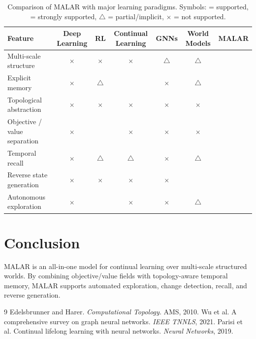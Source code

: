 \documentclass[11pt,english]{article}
\theoremstyle{remark}
\begin{document}
\begin{table}[t]
	\centering
	\caption{Comparison of MALAR with major learning paradigms. 
		Symbols: \checkmark = supported, \checkmark\checkmark = strongly supported, 
		$\triangle$ = partial/implicit, $\times$ = not supported.}
	\label{tab:comparison}
	\begin{tabular}{lcccccc}
		\toprule
		\textbf{Feature} 
		& \textbf{Deep Learning} 
		& \textbf{RL} 
		& \textbf{Continual Learning} 
		& \textbf{GNNs} 
		& \textbf{World Models} 
		& \textbf{MALAR} \\
		\midrule
		Multi-scale structure            & $\times$ & $\times$ & $\times$ & $\triangle$ & $\triangle$ & \textbf{\checkmark} \\
		Explicit memory                  & $\times$ & $\triangle$ & \checkmark & $\times$ & $\triangle$ & \textbf{\checkmark\checkmark} \\
		Topological abstraction          & $\times$ & $\times$ & $\times$ & $\times$ & $\times$ & \textbf{\checkmark} \\
		Objective / value separation     & $\times$ & \checkmark & $\times$ & $\times$ & $\times$ & \textbf{\checkmark} \\
		Temporal recall                  & $\times$ & $\triangle$ & $\triangle$ & $\times$ & $\triangle$ & \textbf{\checkmark\checkmark} \\
		Reverse state generation         & $\times$ & $\times$ & $\times$ & $\times$ & \checkmark & \textbf{\checkmark\checkmark} \\
		Autonomous exploration           & $\times$ & \checkmark & $\times$ & $\times$ & $\triangle$ & \textbf{\checkmark} \\
		\bottomrule
	\end{tabular}
\end{table}

\section{Conclusion}
MALAR is an all-in-one model for continual learning over multi-scale structured worlds. By combining objective/value fields
with topology-aware temporal memory, MALAR supports automated exploration, change detection, recall, and reverse generation.


\begin{thebibliography}{9}
	 Edelsbrunner and Harer. \emph{Computational Topology}. AMS, 2010.
	 Wu et al. A comprehensive survey on graph neural networks. \emph{IEEE TNNLS}, 2021.
	 Parisi et al. Continual lifelong learning with neural networks. \emph{Neural Networks}, 2019.
\end{thebibliography}
\end{document}
